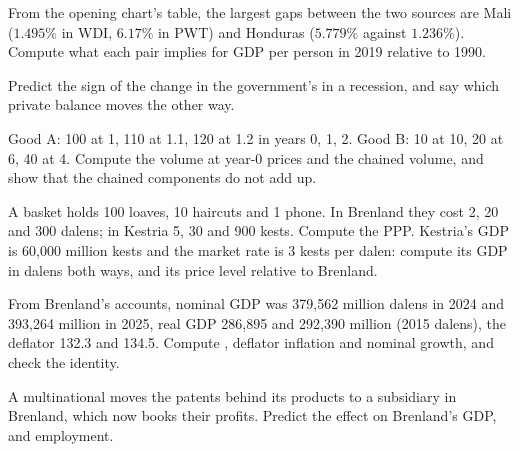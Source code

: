 \begin{exercise}[$\star$]\label{exo:b1:national-accounts-in-depth:read}
From the opening chart's table, the largest gaps between the two sources
are Mali ($1.495\%$ in WDI, $6.17\%$ in PWT) and Honduras ($5.779\%$ against $1.236\%$).
Compute what each pair implies for GDP per person in 2019 relative to
1990.
\end{exercise}

\begin{exercise}[$\star$]\label{exo:b1:national-accounts-in-depth:recession}
Predict the sign of the change in the government's  in a
recession, and say which private balance moves the other way.
\end{exercise}

\begin{exercise}[$\star\star$]\label{exo:b1:national-accounts-in-depth:chain-ex}
Good A: 100 at 1, 110 at 1.1, 120 at 1.2 in years 0, 1, 2. Good B: 10 at 10, 20 at 6,
40 at 4. Compute the volume at year-0 prices and the chained volume, and show
that the chained components do not add up.
\end{exercise}

\begin{exercise}[$\star\star$]\label{exo:b1:national-accounts-in-depth:ppp-ex}
A basket holds 100 loaves, 10 haircuts and 1 phone. In Brenland they cost
2, 20 and 300 dalens; in Kestria 5, 30 and 900 kests. Compute the PPP. Kestria's
GDP is 60,000 million kests and the market rate is 3 kests per dalen: compute
its GDP in dalens both ways, and its price level relative to Brenland.
\end{exercise}

\begin{exercise}[$\star\star$]\label{exo:b1:national-accounts-in-depth:brenland}
From Brenland's accounts, nominal GDP was 379,562 million dalens in 2024 and
393,264 million in 2025, real GDP 286,895 and 292,390 million (2015 dalens), the
deflator 132.3 and 134.5. Compute , deflator inflation and nominal
growth, and check the identity.
\end{exercise}

\begin{exercise}[$\star\star$]\label{exo:b1:national-accounts-in-depth:ip}
A multinational moves the patents behind its products to a subsidiary in
Brenland, which now books their profits. Predict the effect on Brenland's
GDP,  and employment.
\end{exercise}

